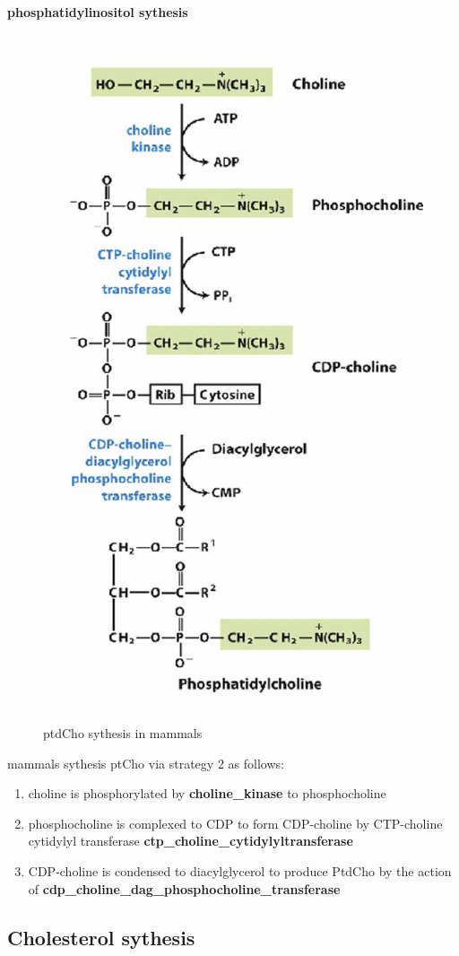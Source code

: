 \documentclass[../main.tex]{subfiles}
\begin{document}
\paragraph{phosphatidylinositol sythesis}
\begin{figure}[H]
    \centering
    \includegraphics[width=0.5\linewidth]{ptdChomammals.png}
    \caption{ptdCho sythesis in mammals}
    \label{fig:enter-label}
\end{figure}
mammals sythesis ptCho via strategy 2 as follows:
\begin{enumerate}
    \item choline is phosphorylated by \textbf{\gls{choline_kinase} }to 
phosphocholine  
    \item phosphocholine is complexed to CDP to form 
    CDP-choline by CTP-choline cytidylyl 
    transferase \textbf{\gls{ctp_choline_cytidylyltransferase}}
    \item  CDP-choline is condensed to diacylglycerol to 
produce PtdCho by the action of \textbf{\gls{cdp_choline_dag_phosphocholine_transferase}}
\end{enumerate}

\subsection{Cholesterol sythesis}
\end{document}
